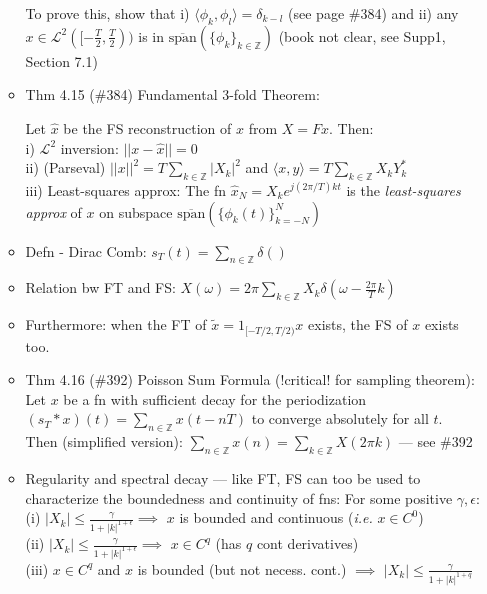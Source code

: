 \documentclass{article}
\newcommand{\ie}{\textit{i.e. }}
\newcommand{\la}{\langle}
\newcommand{\ra}{\rangle}
\newcommand{\cg}{\color{gray}}
\newcommand{\fs}{\footnotesize}
\begin{document}
\begin{itemize}
\begin{itemize}
{{\fs To prove this, show that i) $\la \phi_k,\phi_l \ra=\delta_{k-l}$ (see page \#384) and ii) any $x\in\mathcal{L}^{2}([-\frac{T}{2},\frac{T}{2}))$ is in $\overline{\text{span}}(\{\phi_k\}_{k\in\mathbb{Z}})$ (book not clear, see Supp1, Section 7.1)}
}
\item Thm 4.15 (\#384) Fundamental 3-fold Theorem:\\
{\cg\fs
Let $\hat{x}$ be the FS reconstruction of $x$ from $X=Fx$. Then:\\
i) $\mathcal{L}^2$ inversion: $||x-\hat{x}||=0$ \\
ii) (Parseval) $||x||^2=T\sum\limits_{k\in\mathbb{Z}}|X_k|^2$ and $\la x,y \ra = T\sum_{k\in\mathbb{Z}}X_kY^{*}_k$\\
iii) Least-squares approx: The fn $\hat{x}_N=X_k e^{j(2\pi/T)kt}$ is the \textit{least-squares approx} of $x$ on subspace $\overline{\text{span}}(\{\phi_k(t)\}^N_{k=-N})$

}
\item Defn \-- Dirac Comb: $s_T(t)=\sum\limits_{n\in\mathbb{Z}}\delta()  $
\item Relation bw FT and FS: $X(\omega) = 2\pi \sum\limits_{k \in \mathbb{Z}}X_k\delta (\omega-\frac{2\pi}{T}k)$
\item Furthermore: when the FT of {\cg $\tilde{x}=1_{[-T/2,T/2)}x$ exists, the FS of $x$ exists too.}
\item Thm 4.16 (\#392) Poisson Sum Formula (!critical! for sampling theorem): \\
{\cg Let $x$ be a fn with sufficient decay for the periodization $(s_T*x)(t)=\sum_{n\in\mathbb{Z}}x(t-nT)$ to converge absolutely for all $t$.\\
Then (simplified version): $\sum_{n\in\mathbb{Z}}x(n)=\sum_{k\in\mathbb{Z}}X(2\pi k)$ --- see \#392 }
\item Regularity and spectral decay --- {\cg like FT, FS can too be used to characterize the boundedness and continuity of fns:}
{\cg\fs For some positive $\gamma, \epsilon$: \\
(i) $|X_k| \le \frac{\gamma}{1+|k|^{1+\epsilon}} \implies $ $x$ is bounded and continuous (\ie $x \in C^{0}$) \\
(ii) $|X_k| \le \frac{\gamma}{1+|k|^{1+\epsilon}} \implies $ $x\in C^{q}$ (has $q$ cont derivatives) \\
(iii) $x \in C^{q}$ and $x$ is bounded (but not necess. cont.) $\implies$ $|X_k| \le \frac{\gamma}{1+|k|^{1+q}}$ 
}
\end{itemize}

\end{itemize}
\end{document}
